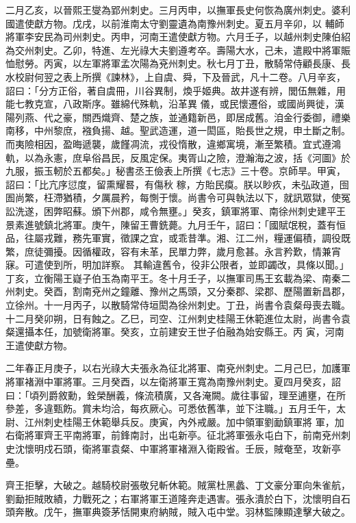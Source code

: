\begin{pinyinscope}
 二月乙亥，以晉熙王燮為郢州刺史。三月丙申，以撫軍長史何恢為廣州刺史。婆利國遣使獻方物。戊戌，以前淮南太守劉靈遺為南豫州刺史。夏五月辛卯，以
 輔師將軍李安民為司州刺史。丙申，河南王遣使獻方物。六月壬子，以越州刺史陳伯紹為交州刺史。乙卯，特進、左光祿大夫劉遵考卒。壽陽大水，己未，遣殿中將軍賑恤慰勞。丙寅，以左軍將軍孟次陽為兗州刺史。秋七月丁丑，散騎常侍顧長康、長水校尉何翌之表上所撰《諫林》，上自虞、舜，下及晉武，凡十二卷。八月辛亥，詔曰：「分方正俗，著自虞冊，川谷異制，煥乎姬典。故井遂有辨，閭伍無雜，用能七教克宣，八政斯序。雖綿代殊軌，沿革異
 儀，或民懷遷俗，或國尚興徙，漢陽列燕、代之豪，關西熾齊、楚之族，並通籍新邑，即居成舊。洎金行委御，禮樂南移，中州黎庶，襁負揚、越。聖武造運，道一閎區，貽長世之規，申土斷之制。而夷險相因，盈晦遞襲，歲饉凋流，戎役惰散，違鄉寓境，漸至繁積。宜式遵鴻軌，以為永憲，庶阜俗昌民，反風定保。夷胥山之險，澄瀚海之波，括《河圖》於九服，振玉軔於五都矣。」秘書丞王儉表上所撰《七志》三十卷。京師旱。甲寅，詔曰：「比亢序愆度，留熏耀晷，有傷秋
 稼，方貽民瘼。朕以眇疚，未弘政道，囹圄尚繁，枉滯猶積，夕厲晨矜，每惻于懷。尚書令可與執法以下，就訊眾獄，使冤訟洗遂，困弊昭蘇。頒下州郡，咸令無壅。」癸亥，鎮軍將軍、南徐州刺史建平王景素進號鎮北將軍。庚午，陳留王曹銑薨。九月壬午，詔曰：「國賦氓稅，蓋有恒品，往屬戎難，務先軍實，徵課之宜，或乖昔準。湘、江二州，糧運偏積，調役既繁，庶徒彌擾。因循權政，容有未革，民單力弊，歲月愈甚。永言矜歎，情兼宵寐。可遣使到所，明加詳察。
 其輸違舊令，役非公限者，並即蠲改，具條以聞。」丁亥，立衡陽王嶷子伯玉為南平王。冬十月壬子，以撫軍司馬王玄載為梁、南秦二州刺史。癸酉，割南兗州之鐘離、豫州之馬頭，又分秦郡、梁郡、歷陽置新昌郡，立徐州。十一月丙子，以散騎常侍垣閎為徐州刺史。丁丑，尚書令袁粲母喪去職。十二月癸卯朔，日有蝕之。乙巳，司空、江州刺史桂陽王休範進位太尉，尚書令袁粲還攝本任，加號衛將軍。癸亥，立前建安王世子伯融為始安縣王。丙
 寅，河南王遣使獻方物。



 二年春正月庚子，以右光祿大夫張永為征北將軍、南兗州刺史。二月己巳，加護軍將軍褚淵中軍將軍。三月癸酉，以左衛將軍王寬為南豫州刺史。夏四月癸亥，詔曰：「頃列爵敘勳，銓榮酬義，條流積廣，又各淹闕。歲往事留，理至逋壅，在所參差，多違甄飭。賞未均洽，每疚厥心。可悉依舊準，並下注職。」五月壬午，太尉、江州刺史桂陽王休範舉兵反。庚寅，內外戒嚴。加中領軍劉勔鎮軍將
 軍，加右衛將軍齊王平南將軍，前鋒南討，出屯新亭。征北將軍張永屯白下，前南兗州刺史沈懷明戍石頭，衛將軍袁粲、中軍將軍褚淵入衛殿省。壬辰，賊奄至，攻新亭壘。



 齊王拒擊，大破之。越騎校尉張敬兒斬休範。賊黨杜黑蠡、丁文豪分軍向朱雀航，劉勔拒賊敗績，力戰死之；右軍將軍王道隆奔走遇害。張永潰於白下，沈懷明自石頭奔散。戊午，撫軍典簽茅恬開東府納賊，賊入屯中堂。羽林監陳顯達擊大破之。




\end{pinyinscope}
